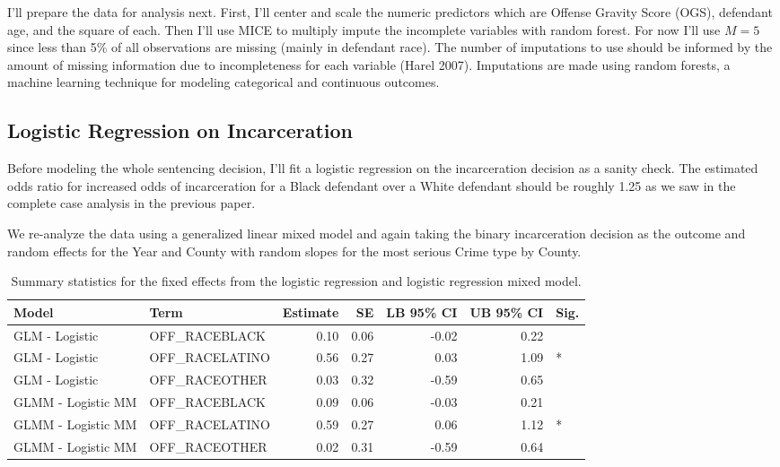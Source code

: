 \documentclass[
  letterpaper,
  DIV=11,
  numbers=noendperiod]{scrartcl}
\begin{document}
I'll prepare the data for analysis next. First, I'll center and scale
the numeric predictors which are Offense Gravity Score (OGS), defendant
age, and the square of each. Then I'll use MICE to multiply impute the
incomplete variables with random forest. For now I'll use \(M = 5\)
since less than 5\% of all observations are missing (mainly in defendant
race). The number of imputations to use should be informed by the amount
of missing information due to incompleteness for each variable (Harel
2007). Imputations are made using random forests, a machine learning
technique for modeling categorical and continuous outcomes.

\hypertarget{logistic-regression-on-incarceration}{%
\subsection{Logistic Regression on
Incarceration}\label{logistic-regression-on-incarceration}}

Before modeling the whole sentencing decision, I'll fit a logistic
regression on the incarceration decision as a sanity check. The
estimated odds ratio for increased odds of incarceration for a Black
defendant over a White defendant should be roughly 1.25 as we saw in the
complete case analysis in the previous paper.

\begin{table}

\end{table}

We re-analyze the data using a generalized linear mixed model and again
taking the binary incarceration decision as the outcome and random
effects for the Year and County with random slopes for the most serious
Crime type by County.

\hypertarget{tbl-glmm-sum}{}
\begin{table}
\caption{\label{tbl-glmm-sum}Summary statistics for the fixed effects from the logistic regression
and logistic regression mixed model. }\tabularnewline

\centering
\begin{tabular}{llrrrrl}
\toprule
Model & Term & Estimate & SE & LB 95\% CI & UB 95\% CI & Sig.\\
\midrule
GLM - Logistic & OFF\_RACEBLACK & 0.10 & 0.06 & -0.02 & 0.22 & \\
GLM - Logistic & OFF\_RACELATINO & 0.56 & 0.27 & 0.03 & 1.09 & *\\
GLM - Logistic & OFF\_RACEOTHER & 0.03 & 0.32 & -0.59 & 0.65 & \\
GLMM - Logistic MM & OFF\_RACEBLACK & 0.09 & 0.06 & -0.03 & 0.21 & \\
GLMM - Logistic MM & OFF\_RACELATINO & 0.59 & 0.27 & 0.06 & 1.12 & *\\
\addlinespace
GLMM - Logistic MM & OFF\_RACEOTHER & 0.02 & 0.31 & -0.59 & 0.64 & \\
\bottomrule
\end{tabular}
\end{table}
\end{document}
